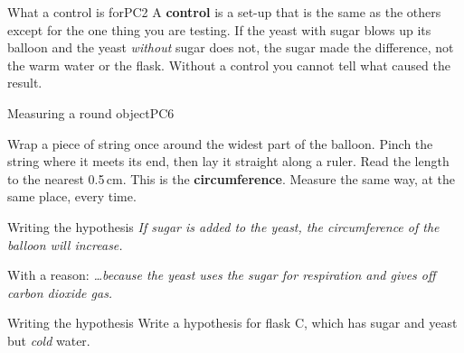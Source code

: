 
\begin{technique}{What a control is for}{PC2}
A \textbf{control} is a set-up that is the same as the others except for the one thing you are testing. If the yeast with sugar blows up its balloon and the yeast \emph{without} sugar does not, the sugar made the difference, not the warm water or the flask. Without a control you cannot tell what caused the result.
\end{technique}

\begin{technique}{Measuring a round object}{PC6}
\begin{minipage}[c]{0.62\linewidth}
Wrap a piece of string once around the widest part of the balloon. Pinch the string where it meets its end, then lay it straight along a ruler. Read the length to the nearest 0.5\,cm. This is the \textbf{circumference}. Measure the same way, at the same place, every time.
\end{minipage}\hfill
\begin{minipage}[c]{0.34\linewidth}\centering
{}
\end{minipage}
\end{technique}

\begin{workedex}{Writing the hypothesis}
\emph{If sugar is added to the yeast, the circumference of the balloon will increase.}

\smallskip
With a reason: \emph{\dots because the yeast uses the sugar for respiration and gives off carbon dioxide gas.}
\end{workedex}

\begin{wedo}{Writing the hypothesis}
Write a hypothesis for flask C, which has sugar and yeast but \emph{cold} water.
\answerbox{3cm}
\end{wedo}


